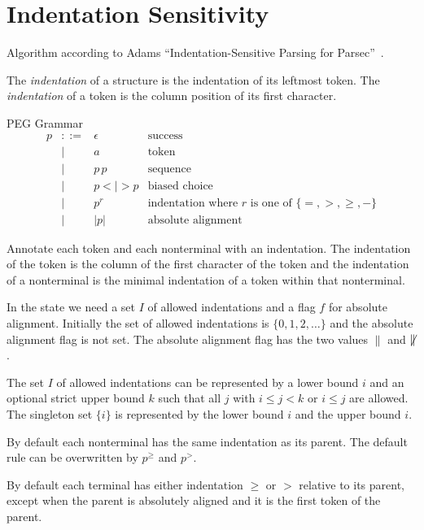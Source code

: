 \section{Indentation Sensitivity}

Algorithm according to Adams ``Indentation-Sensitive Parsing for
Parsec''~\cite{adams2014}.

\begin{definition}
  The \emph{indentation} of a structure is the indentation of its leftmost
  token. The \emph{indentation} of a token is the column position of its first
  character.
\end{definition}


PEG Grammar
$$
\begin{array}{llll}
  p &::=& \epsilon   &\text{success}
  \\
    &\mid& a         &\text{token}
  \\
    &\mid& p \, p      &\text{sequence}
  \\
    &\mid& p <\mid> p  &\text{biased choice}
  \\
    &\mid& p^r         &\text{indentation where $r$ is one of }\{=,>,\ge,-\}
  \\
    &\mid& |p|         &\text{absolute alignment}
\end{array}
$$

Annotate each token and each nonterminal with an indentation. The indentation
of the token is the column of the first character of the token and the
indentation of a nonterminal is the minimal indentation of a token within that
nonterminal.


In the state we need a set $I$ of allowed indentations and a flag $f$ for
absolute alignment. Initially the set of allowed indentations is
$\{0,1,2, \ldots\}$ and the absolute alignment flag is not set. The absolute
alignment flag has the two values $\parallel$ and ${\not\parallel}$.

The set $I$ of allowed indentations can be represented by a lower bound $i$
and an optional strict upper bound $k$ such that all $j$ with $i \le j < k$ or
$i \le j$ are allowed. The singleton set $\{i\}$ is represented by the lower
bound $i$ and the upper bound $i$.

By default each nonterminal has the same indentation as its parent. The
default rule can be overwritten by $p^{\ge}$ and $p^>$.

By default each terminal has either indentation $\ge$ or $>$ relative to its
parent, except when the parent is absolutely aligned and it is the first token
of the parent.



